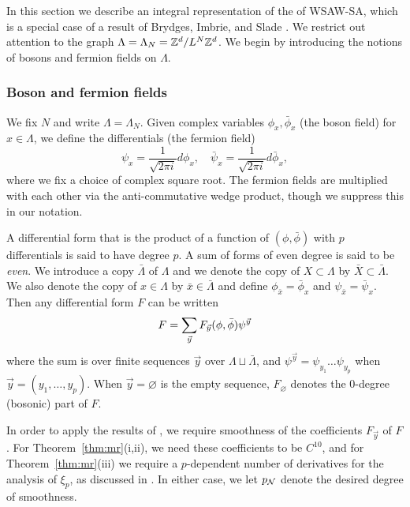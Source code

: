 In this section we describe an integral representation of the of WSAW-SA, which
is a special case of a result of Brydges, Imbrie, and Slade \cite{BIS09}.
We restrict out attention to the graph $\Lambda = \Lambda_N = { {{\mathbb Z}}^d }/L^N{ {{\mathbb Z}}^d }$.
We begin by introducing the notions of bosons and fermion fields on $\Lambda$.

\subsubsection{Boson and fermion fields}
\label{sec:forms}

We fix $N$ and write $\Lambda = \Lambda_N$.
Given complex variables $\phi_x, \bar\phi_x$
(the boson field) for $x \in \Lambda$,
we define the differentials (the fermion field)
\begin{equation}
\psi_x = \frac{1}{\sqrt{2\pi i}} d\phi_x,
\quad
\bar\psi_x = \frac{1}{\sqrt{2\pi i}} d\bar\phi_x,
\end{equation}
where we fix a choice of complex square root.
The fermion fields are multiplied with each other
via the anti-commutative wedge product,
though we suppress this in our notation.

A differential form that is the
product of a function of $(\phi, \bar\phi)$
with $p$ differentials is said to have degree $p$.
A sum of forms of even degree is said to be \emph{even}.
We introduce a copy $\bar\Lambda$ of $\Lambda$
and we denote the copy of $X \subset \Lambda$ by $\bar X \subset \bar\Lambda$.
We also denote the copy of $x \in \Lambda$
by $\bar x \in \bar\Lambda$ and define $\phi_{\bar x} = \bar\phi_x$ and $\psi_{\bar x} = \bar\psi_x$.
Then any differential form $F$ can be written
\begin{equation}
\lbeq{FinNcal}
F
=
\sum_{\vec y}
F_{\vec y} (\phi, \bar\phi)
\psi^{\vec y}
\end{equation}
where the sum is over finite sequences $\vec y$ over $\Lambda\sqcup\bar\Lambda$,
and $\psi^{\vec y} = \psi_{y_1} \ldots \psi_{y_p}$ when $\vec y = (y_1, \ldots, y_p)$.
When $\vec y = \varnothing$ is the empty sequence,
$F_\varnothing$ denotes the $0$-degree (bosonic) part of $F$.

In order to apply the results of \cite{BBS-saw4-log,BBS-saw4,BSTW-clp}, we require
smoothness of the coefficients $F_{\vec y}$ of $F$.  For Theorem~\ref{thm:mr}(i,ii),
we need these coefficients to be $C^{10}$, and for Theorem~\ref{thm:mr}(iii) we require
a $p$-dependent number of derivatives for the analysis of $\xi_p$, as discussed in \cite{BSTW-clp}.
In either case, we let $p_{\mathcal{N}}$ denote the desired degree of smoothness.

